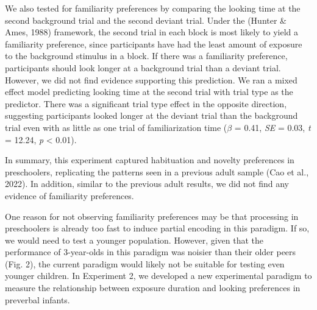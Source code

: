 \documentclass[10pt, letterpaper]{article}
\begin{document}
We also tested for familiarity preferences by comparing the looking time
at the second background trial and the second deviant trial. Under the
(Hunter \& Ames, 1988) framework, the second trial in each block is most
likely to yield a familiarity preference, since participants have had
the least amount of exposure to the background stimulus in a block. If
there was a familiarity preference, participants should look longer at a
background trial than a deviant trial. However, we did not find evidence
supporting this prediction. We ran a mixed effect model predicting
looking time at the second trial with trial type as the predictor. There
was a significant trial type effect in the opposite direction,
suggesting participants looked longer at the deviant trial than the
background trial even with as little as one trial of familiarization
time (\(\beta\) = 0.41, \emph{SE} = 0.03, \emph{t} = 12.24, \emph{p}
\textless{} 0.01).

In summary, this experiment captured habituation and novelty preferences
in preschoolers, replicating the patterns seen in a previous adult
sample (Cao et al., 2022). In addition, similar to the previous adult
results, we did not find any evidence of familiarity preferences.

One reason for not observing familiarity preferences may be that
processing in preschoolers is already too fast to induce partial
encoding in this paradigm. If so, we would need to test a younger
population. However, given that the performance of 3-year-olds in this
paradigm was noisier than their older peers (Fig. 2), the current
paradigm would likely not be suitable for testing even younger children.
In Experiment 2, we developed a new experimental paradigm to measure the
relationship between exposure duration and looking preferences in
preverbal infants.
\end{document}
